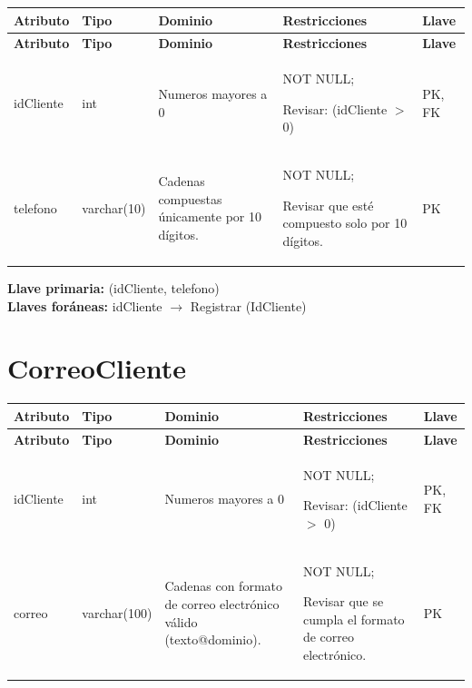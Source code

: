 \documentclass[12pt]{article}
\begin{document}
\begin{longtable}{p{2.2cm} p{2.2cm} p{5.8cm} p{4.2cm} p{1.2cm}}
\label{tab:telefonocliente}\\
\toprule
\textbf{Atributo} & \textbf{Tipo} & \textbf{Dominio} & \textbf{Restricciones} & \textbf{Llave} \\
\midrule
\endfirsthead

\toprule
\textbf{Atributo} & \textbf{Tipo} & \textbf{Dominio} & \textbf{Restricciones} & \textbf{Llave} \\
\midrule
\endhead

\bottomrule
\endfoot


idCliente 
& int 
& Numeros mayores a 0
& NOT NULL;

Revisar: (idCliente $>$ 0)
& PK, FK \\

telefono 
& varchar(10) 
& Cadenas compuestas únicamente por 10 dígitos.
& NOT NULL;

Revisar que esté compuesto solo por 10 dígitos.
& PK \\

\end{longtable}

\textbf{Llave primaria:} (idCliente, telefono)\\
\textbf{Llaves foráneas:} idCliente $\rightarrow$ Registrar (IdCliente)

 

\section*{CorreoCliente}

\begin{longtable}{p{3.2cm} p{2.2cm} p{4.8cm} p{4.2cm} p{1.2cm}}
\label{tab:correocliente}\\
\toprule
\textbf{Atributo} & \textbf{Tipo} & \textbf{Dominio} & \textbf{Restricciones} & \textbf{Llave} \\
\midrule
\endfirsthead

\toprule
\textbf{Atributo} & \textbf{Tipo} & \textbf{Dominio} & \textbf{Restricciones} & \textbf{Llave} \\
\midrule
\endhead

\bottomrule
\endfoot


idCliente 
& int 
& Numeros mayores a 0
& NOT NULL;

Revisar: (idCliente $>$ 0)
& PK, FK \\

correo 
& varchar(100) 
& Cadenas con formato de correo electrónico válido (texto@dominio).
& NOT NULL;

Revisar que se cumpla el formato de correo electrónico.
& PK \\

\end{longtable}
\end{document}
